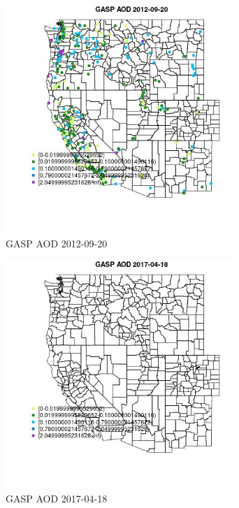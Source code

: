 \begin{figure} 
\centering  
\includegraphics[width=0.77\textwidth]{Code_Outputs/Report_ML_input_PM25_Step4_part_e_de_duplicated_aves_compiled_2019-05-14wNAs_MapObsGASP_AOD2012-09-20.jpg} 
\caption{\label{fig:Report_ML_input_PM25_Step4_part_e_de_duplicated_aves_compiled_2019-05-14wNAsMapObsGASP_AOD2012-09-20}GASP AOD 2012-09-20} 
\end{figure} 
 

\begin{figure} 
\centering  
\includegraphics[width=0.77\textwidth]{Code_Outputs/Report_ML_input_PM25_Step4_part_e_de_duplicated_aves_compiled_2019-05-14wNAs_MapObsGASP_AOD2017-04-18.jpg} 
\caption{\label{fig:Report_ML_input_PM25_Step4_part_e_de_duplicated_aves_compiled_2019-05-14wNAsMapObsGASP_AOD2017-04-18}GASP AOD 2017-04-18} 
\end{figure} 
 

